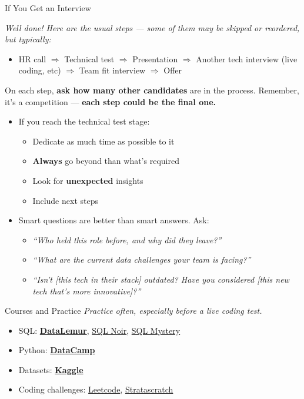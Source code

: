 \documentclass[10pt,a4paper]{article}
\begin{document}
\begin{multicols}{3}
\begin{textbox}{If You Get an Interview}

\textit{Well done! Here are the usual steps — some of them may be skipped or reordered, but typically:}

\begin{itemize}
    \item HR call $\Rightarrow$ Technical test $\Rightarrow$ Presentation $\Rightarrow$ Another tech interview (live coding, etc) $\Rightarrow$ Team fit interview $\Rightarrow$ Offer
  \end{itemize}

On each step, \textbf{ask how many other candidates} are in the process. Remember, it’s a competition — \textbf{each step could be the final one.}
\begin{itemize}    
\item If you reach the technical test stage:
  \begin{itemize}
    \item  Dedicate as much time as possible to it
    \item \textbf{Always} go beyond than what’s required
    \item Look for \textbf{unexpected} insights 
    \item Include next steps
  \end{itemize}
  \item Smart questions are better than smart answers. Ask:
  \begin{itemize}
    \item \textit{“Who held this role before, and why did they leave?”}
    \item \textit{“What are the current data challenges your team is facing?”}
    \item \textit{“Isn’t [this tech in their stack] outdated? Have you considered [this new tech that’s more innovative]?”}
  \end{itemize}
\end{itemize}

\end{textbox}

\begin{textbox}{Courses and Practice}
\emph{Practice often, especially before a live coding test.}

\begin{itemize}
    \item SQL: \href{https://datalemur.com/}{\textbf{DataLemur}}, \href{https://www.sqlnoir.com/}{SQL Noir}, \href{https://mystery.knightlab.com/}{SQL Mystery}
    \item Python: \href{https://datacamp.com/}{\textbf{DataCamp}}
    \item Datasets: \href{https://www.kaggle.com/}{\textbf{Kaggle}}
    \item Coding challenges: \href{https://leetcode.com/}{Leetcode}, \href{https://www.stratascratch.com/}{Stratascratch}
\end{itemize}
\end{textbox}


\end{multicols}
\end{document}
